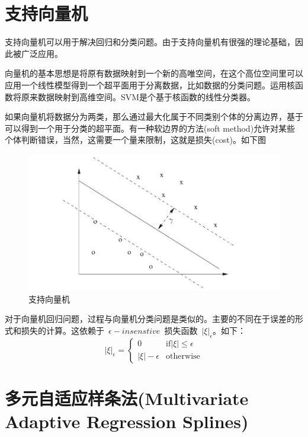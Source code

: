 \documentclass{article}\usepackage[]{graphicx}\usepackage[]{color}
\begin{document}
\begin{CJK*}{UTF8}{gkai}
\section{支持向量机}
支持向量机可以用于解决回归和分类问题。由于支持向量机有很强的理论基础，因此被广泛应用。


向量机的基本思想是将原有数据映射到一个新的高唯空间，在这个高位空间里可以应用一个线性模型得到一个超平面用于分离数据，比如数据的分类问题。运用核函数将原来数据映射到高维空间。SVM是个基于核函数的线性分类器。

如果向量机将数据分为两类，那么通过最大化属于不同类别个体的分离边界，基于可以得到一个用于分类的超平面。有一种软边界的方法(soft method)允许对某些个体判断错误，当然，这需要一个量来限制，这就是损失(cost)。如下图
\begin{figure}[ht]
\centering
\includegraphics[width = 12cm]{./svm.jpeg}
\caption{支持向量机}
\end{figure}

对于向量机回归问题，过程与向量机分类问题是类似的。主要的不同在于误差的形式和损失的计算。这依赖于~$\epsilon-insenstive$~损失函数~$|\xi|_\epsilon$。如下：
\begin{equation*}
|\xi|_\epsilon = \left\{\begin{array}{ll}
0 & \text{if} |\xi| \leq \epsilon\\
|\xi|-\epsilon &\text{otherwise}
\end{array}\right.
\end{equation*}
\section{多元自适应样条法(Multivariate Adaptive Regression Splines)}


\end{CJK*}
\end{document}
